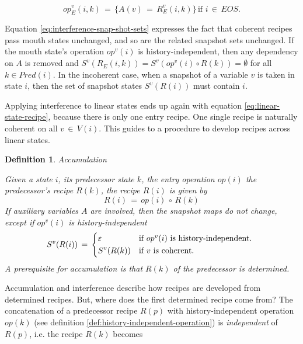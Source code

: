 \documentclass[12pt,a4paper]{scrartcl}
\newtheorem{definition}{Definition}
\begin{document}
\begin{equation} \label{eq:entry-operation-implementation}
      op_E^v(i,k) \,=\, \{ A(v) \,=\, R^v_E(i,k) \} \,\mbox{if $i\,\in\,EOS$}.
\end{equation}

Equation \eqref{eq:interference-snap-shot-sets} expresses the fact that
coherent recipes pass mouth states unchanged, and so are the related snapshot
sets unchanged. If the mouth state's operation $op^v(i)$ is
history-independent, then any dependency on $A$ is removed and
$S^v(R_E(i,k))=S^v(op^v(i)\circ R(k))=\emptyset$ for all $k \in Pred(i)$. 
In the incoherent case, when a snapshot of a variable $v$ is taken in state
$i$, then the set of snapshot states $S^v(R(i))$ must contain $i$.  

Applying interference to linear states ends up again with equation
\eqref{eq:linear-state-recipe}, because there is only one entry recipe.  One
single recipe is naturally coherent on all $v\,\in\,V(i)$. This guides to a
procedure to develop recipes across linear states.

\begin{definition} Accumulation

Given a state $i$, its predecessor state $k$, the entry operation $op(i)$
the predecessor's recipe $R(k)$, the recipe $R(i)$ is given by
\begin{equation}
       R(i)\,=\,op(i)\,\circ\,R(k)
\end{equation}
If auxiliary variables $A$ are involved, then the snapshot maps do not change,
except if $op^v(i)$ is history-independent
\begin{equation} \label{eq:accumulation-aux}
    S^v(R(i))\,=\,\begin{dcases*}
                  \varepsilon & if $op^v(i)$ is history-independent. \\
                  S^v(R(k))   & if $v$ is coherent.\\
                \end{dcases*}
\end{equation}
A prerequisite for accumulation is that $R(k)$ of the predecessor is 
determined.
\end{definition}

Accumulation and interference describe how recipes are developed from
determined recipes.  But, where does the first determined recipe come from?
The concatenation of a predecessor recipe $R(p)$ with history-independent
operation $op(k)$ (see definition \ref{def:history-independent-operation}) is
\textit{independent} of $R(p)$, i.e. the recipe $R(k)$ becomes
\end{document}
